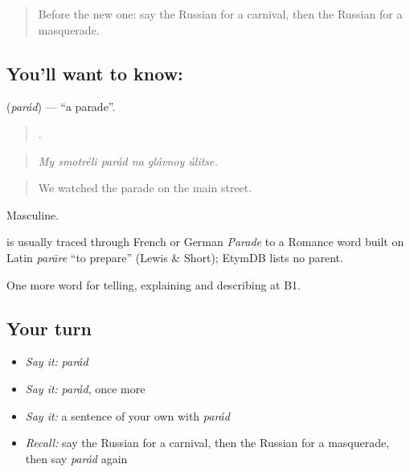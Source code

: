 \label{lesson:RU-C316-parad}



\begin{quote}
Before the new one: say the Russian for a carnival, then the Russian for a masquerade.
\end{quote}

\subsection*{You'll want to know: }
\textbf{} (\emph{parád}) — \textquotedblleft{}a parade\textquotedblright{}.

\begin{quote}
     .
\end{quote}

\begin{quote}
\emph{My smotréli parád na glávnoy úlitse.}
\end{quote}

\begin{quote}
We watched the parade on the main street.
\end{quote}

Masculine.

\begin{cousinweb}
\emph{} is usually traced through French or German \emph{Parade} to a Romance word built on Latin \emph{parāre} \textquotedblleft{}to prepare\textquotedblright{} (Lewis \& Short); EtymDB lists no parent.
\end{cousinweb}

\begin{grammarlens}[title={What you've built}]
One more word for telling, explaining and describing at B1.
\end{grammarlens}

\subsection*{Your turn}
\begin{itemize}
\raggedright
  \item \emph{Say it:} \emph{parád}
  \item \emph{Say it:} \emph{parád}, once more
  \item \emph{Say it:} a sentence of your own with \emph{parád}
  \item \emph{Recall:} say the Russian for a carnival, then the Russian for a masquerade, then say \emph{parád} again
\end{itemize}

